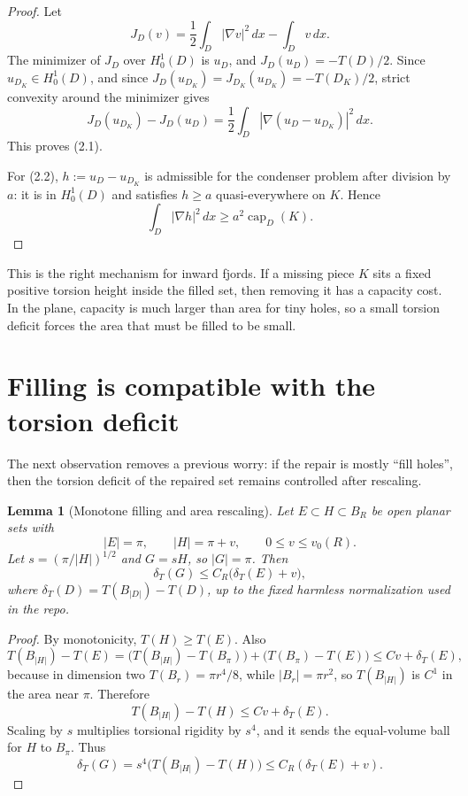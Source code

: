\documentclass[11pt]{article}
\newtheorem{lemma}[theorem]{Lemma}
\newcommand{\dT}{\delta_T}
\newcommand{\capr}{\operatorname{cap}}
\begin{document}
\begin{proof}
Let
\[
   J_D(v)=\frac12\int_D|\nabla v|^2\,dx-\int_D v\,dx .
\]
The minimizer of \(J_D\) over \(H^1_0(D)\) is \(u_D\), and
\(J_D(u_D)=-T(D)/2\).  Since \(u_{D_K}\in H^1_0(D)\), and since
\(J_D(u_{D_K})=J_{D_K}(u_{D_K})=-T(D_K)/2\), strict convexity around
the minimizer gives
\[
   J_D(u_{D_K})-J_D(u_D)
      =\frac12\int_D|\nabla(u_D-u_{D_K})|^2\,dx .
\]
This proves (2.1).

For (2.2), \(h:=u_D-u_{D_K}\) is admissible for the condenser problem
after division by \(a\): it is in \(H^1_0(D)\) and satisfies
\(h\ge a\) quasi-everywhere on \(K\).  Hence
\[
   \int_D|\nabla h|^2\,dx\ge a^2\capr_D(K).
\]
\end{proof}

This is the right mechanism for inward fjords.  If a missing piece \(K\)
sits a fixed positive torsion height inside the filled set, then
removing it has a capacity cost.  In the plane, capacity is much larger
than area for tiny holes, so a small torsion deficit forces the area
that must be filled to be small.

\section{Filling is compatible with the torsion deficit}

The next observation removes a previous worry: if the repair is mostly
``fill holes'', then the torsion deficit of the repaired set remains
controlled after rescaling.

\begin{lemma}[Monotone filling and area rescaling]
\label{lem:fillscale}
Let \(E\subset H\subset B_R\) be open planar sets with
\[
   |E|=\pi,\qquad |H|=\pi+v,\qquad 0\le v\le v_0(R).
\]
Let \(s=(\pi/|H|)^{1/2}\) and \(G=sH\), so \(|G|=\pi\).  Then
\[
   \dT(G)\le C_R\bigl(\dT(E)+v\bigr),
   \tag{3.1}
\]
where \(\dT(D)=T(B_{|D|})-T(D)\), up to the fixed harmless normalization
used in the repo.
\end{lemma}

\begin{proof}
By monotonicity, \(T(H)\ge T(E)\).  Also
\[
   T(B_{|H|})-T(E)
      =\bigl(T(B_{|H|})-T(B_\pi)\bigr)+\bigl(T(B_\pi)-T(E)\bigr)
      \le C v+\dT(E),
\]
because in dimension two \(T(B_r)=\pi r^4/8\), while
\(|B_r|=\pi r^2\), so \(T(B_{|H|})\) is \(C^1\) in the area near
\(\pi\).  Therefore
\[
   T(B_{|H|})-T(H)\le C v+\dT(E).
\]
Scaling by \(s\) multiplies torsional rigidity by \(s^4\), and it sends
the equal-volume ball for \(H\) to \(B_\pi\).  Thus
\[
   \dT(G)=s^4\bigl(T(B_{|H|})-T(H)\bigr)
      \le C_R(\dT(E)+v).
\]
\end{proof}
\end{document}
